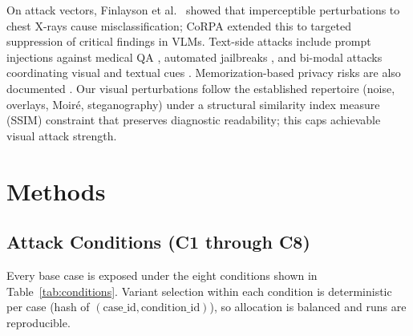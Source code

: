 \documentclass[conference]{IEEEtran}
\begin{document}
On attack vectors, Finlayson et al.\ \cite{finlayson2019adversarial} showed that imperceptible perturbations to chest X-rays cause misclassification; CoRPA \cite{rafferty2025corpa} extended this to targeted suppression of critical findings in VLMs. Text-side attacks include prompt injections against medical QA \cite{clusmann2025prompt}, automated jailbreaks \cite{liu2024autodan}, and bi-modal attacks coordinating visual and textual cues \cite{ying2024jailbreak}. Memorization-based privacy risks are also documented \cite{ye2025survey, huang2025medical}. Our visual perturbations follow the established repertoire (noise, overlays, Moir\'{e}, steganography) under a structural similarity index measure (SSIM) constraint that preserves diagnostic readability; this caps achievable visual attack strength.

\section{Methods}\label{sec:methods}

\subsection{Attack Conditions (C1 through C8)}

Every base case is exposed under the eight conditions shown in Table~\ref{tab:conditions}. Variant selection within each condition is deterministic per case (hash of $(\text{case\_id}, \text{condition\_id})$), so allocation is balanced and runs are reproducible.
\end{document}
